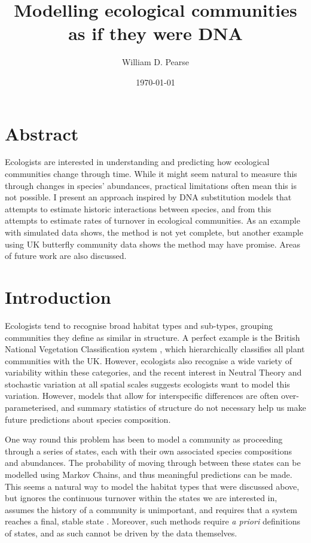 \documentclass[12pt]{amsart}
\title{Modelling ecological communities as if they were DNA}
\author{William D. Pearse}
\date{\today}                                           %
\begin{document}

\maketitle
\section{Abstract}
Ecologists are interested in understanding and predicting how ecological communities change through time. While it might seem natural to measure this through changes in species' abundances, practical limitations often mean this is not possible. I present an approach inspired by DNA substitution models that attempts to estimate historic interactions between species, and from this attempts to estimate rates of turnover in ecological communities. As an example with simulated data shows, the method is not yet complete, but another example using UK butterfly community data shows the method may have promise. Areas of future work are also discussed.

\section{Introduction}
Ecologists tend to recognise broad habitat types and sub-types, grouping communities they define as similar in structure. A perfect example is the British National Vegetation Classification system \citep{Rodwell1991}, which hierarchically classifies all plant communities with the UK. However, ecologists also recognise a wide variety of variability within these categories, and the recent interest in Neutral Theory \citep{Hubbell2001} and stochastic variation at all spatial scales \citep{Vellend2010} suggests ecologists want to model this variation. However, models that allow for interspecific differences are often over-parameterised, and summary statistics of structure do not necessary help us make future predictions about species composition.

One way round this problem has been to model a community as proceeding through a series of states, each with their own associated species compositions and abundances. The probability of moving through between these states can be modelled using Markov Chains, and thus meaningful predictions can be made. This seems a natural way to model the habitat types that were discussed above, but ignores the continuous turnover within the states we are interested in, assumes the history of a community is unimportant, and requires that a system reaches a final, stable state \cite{Logofet2000}. Moreover, such methods require \emph{a priori} definitions of states, and as such cannot be driven by the data themselves.
\end{document}
